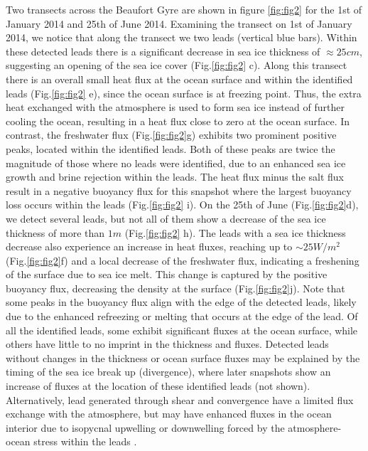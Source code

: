 \documentclass[lineno,sn-basic]{sn-jnl}%
\begin{document}
Two transects across the Beaufort Gyre are shown in figure \ref{fig:fig2} for the 1st of January 2014 and 25th of June 2014.
Examining the transect on 1st of January 2014, we notice that along the transect we two leads (vertical blue bars). Within these detected leads there is a significant decrease in sea ice thickness of $\approx 25cm$, suggesting an opening of the sea ice cover (Fig.\ref{fig:fig2} c).
Along this transect there is an overall small heat flux at the ocean surface and within the identified leads (Fig.\ref{fig:fig2} e), since the ocean surface is at freezing point. Thus, the extra heat exchanged with the atmosphere is used to form sea ice instead of further cooling the ocean, resulting in a heat flux close to zero at the ocean surface.
In contrast, the freshwater flux (Fig.\ref{fig:fig2}g) exhibits two prominent positive peaks, located within the identified leads. Both of these peaks are twice the magnitude of those where no leads were identified, due to an enhanced sea ice growth and brine rejection within the leads. 
The heat flux minus the salt flux result in a negative buoyancy flux for this snapshot where the largest buoyancy loss occurs within the leads (Fig.\ref{fig:fig2} i).
On the 25th of June (Fig.\ref{fig:fig2}d), we detect several leads, but not all of them show a decrease of the sea ice thickness of more than $1m$ (Fig.\ref{fig:fig2} h). The leads with a sea ice thickness decrease also experience an increase in heat fluxes, reaching up to $\sim 25 W/m^2$ (Fig.\ref{fig:fig2}f) and a local decrease of the freshwater flux, indicating a freshening of the surface due to sea ice melt. This change is captured by the positive buoyancy flux, decreasing the density at the surface (Fig.\ref{fig:fig2}j). Note that some peaks in the buoyancy flux align with the edge of the detected leads, likely due to the enhanced refreezing or melting that occurs at the edge of the lead. 
Of all the identified leads, some exhibit significant fluxes at the ocean surface, while others have little to no imprint in the thickness and fluxes. Detected leads  without changes in the thickness or ocean surface fluxes may be explained by the timing of the sea ice break up (divergence), where later snapshots show an increase of fluxes at the location of these identified leads (not shown). Alternatively, lead generated through shear and convergence have a limited flux exchange with the atmosphere, but may have enhanced fluxes in the ocean interior due to isopycnal upwelling or downwelling forced by the atmosphere-ocean stress within the leads \citep{Bourgault_flux_lkf_2020}.
\end{document}
